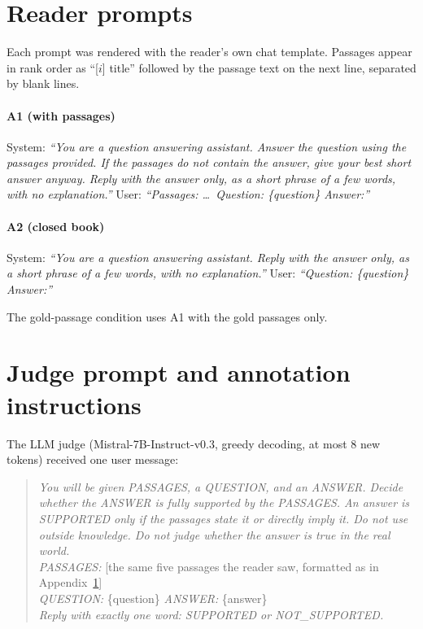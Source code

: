 \section{Reader prompts}\label{app:prompts}
Each prompt was rendered with the reader's own chat template. Passages appear in rank order as ``[$i$] title'' followed by the passage text on the next line, separated by blank lines.

\paragraph{A1 (with passages)} System: \emph{``You are a question answering assistant. Answer the question using the passages provided. If the passages do not contain the answer, give your best short answer anyway. Reply with the answer only, as a short phrase of a few words, with no explanation.''} User: \emph{``Passages: \ldots\ Question: \{question\} Answer:''}

\paragraph{A2 (closed book)} System: \emph{``You are a question answering assistant. Reply with the answer only, as a short phrase of a few words, with no explanation.''} User: \emph{``Question: \{question\} Answer:''}

The gold-passage condition uses A1 with the gold passages only.

\section{Judge prompt and annotation instructions}\label{app:judge}
The LLM judge (Mistral-7B-Instruct-v0.3, greedy decoding, at most 8 new tokens) received one user message:

\begin{quote}\small
\emph{You will be given PASSAGES, a QUESTION, and an ANSWER. Decide whether the ANSWER is fully supported by the PASSAGES. An answer is SUPPORTED only if the passages state it or directly imply it. Do not use outside knowledge. Do not judge whether the answer is true in the real world.}\\
\emph{PASSAGES:} [the same five passages the reader saw, formatted as in Appendix~\ref{app:prompts}]\\
\emph{QUESTION:} \{question\} \quad \emph{ANSWER:} \{answer\}\\
\emph{Reply with exactly one word: SUPPORTED or NOT\_SUPPORTED.}
\end{quote}


